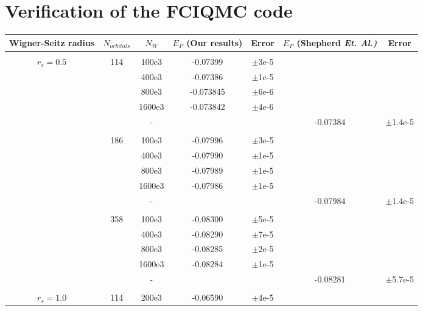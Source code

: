 \documentclass[a4paper,9pt,twocolumn]{revtex4} %
\begin{document}

\section{Verification of the FCIQMC code}

{%
\begin{table*}[ht]
\begin{center}
\begin{ruledtabular}
\begin{tabular}{ccccccc}
	Wigner-Seitz radius&$N_{orbitals}$ & $N_W$ & $E_P$ (Our results) & Error & $E_P$ (Shepherd \it{Et. Al.}) & Error\\
	\hline
	\\
	$r_s=0.5$ 
&114 &		100e3 &	-0.07399 &	$\pm$3e-5 &	         &	\\
&    &		400e3 &	-0.07386 &	$\pm$1e-5 &	         &	\\
&    &		800e3 &	-0.073845& 	$\pm$6e-6 &	         &	\\ 
&    &		1600e3&	-0.073842& 	$\pm$4e-6 &	 			&	\\ 
&&-&&& -0.07384 &	$\pm$1.4e-5 \\ 
\\
%
&186 &		100e3 &	-0.07996 &	$\pm$3e-5 	&         	& \\
&    &		400e3 &	-0.07990 &	$\pm$1e-5 	&         	& \\
&    &		800e3 &	-0.07989 &	$\pm$1e-5 	&         	& \\
&    &		1600e3& -0.07986 &	$\pm$1e-5 	&& \\
&&-&&& -0.07984 	&$\pm$1.4e-5 \\
\\
%
&358 &		100e3 &	-0.08300 &$\pm$5e-5 	&         	& \\
&    &		400e3 &	-0.08290	&$\pm$7e-5 	&         	& \\
&    &		800e3 &	-0.08285	&$\pm$2e-5 	&         	& \\
&    &		1600e3& -0.08284	&$\pm$1e-5 	&&\\
&&-&&& -0.08281 	&$\pm$5.7e-5 \\
\\
%
$r_s=1.0$
%
&114 	&	 200e3 &	-0.06590 &	$\pm$4e-5 &	         &	 \\ 

\end{tabular}
\end{ruledtabular}
\end{center}
\end{table*}}
\end{document}
